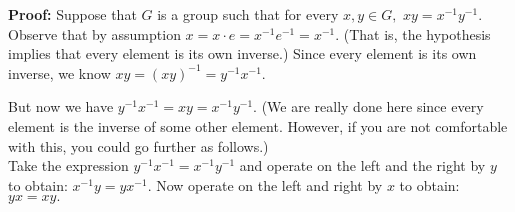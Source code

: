\documentclass[12pt]{article}
\begin{document}
\begin{enumerate}
\textbf{Proof:} Suppose that $G$ is a group such that for every $x,y \in G,$ $xy=x^{-1}y^{-1}.$\\

Observe that by assumption $x=x\cdot e = x^{-1}e^{-1}=x^{-1}.$ (That is, the hypothesis implies that every element is its own inverse.) Since every element is its own inverse, we know $xy=(xy)^{-1}=y^{-1}x^{-1}.$ 

But now we have $ y^{-1}x^{-1}=xy=x^{-1}y^{-1}.$ (We are really done here since every element is the inverse of some other element. However, if you are not comfortable with this, you could go further as follows.)\\

Take the expression $ y^{-1}x^{-1}=x^{-1}y^{-1}$ and operate on the left and the right by $y$ to obtain: $ x^{-1}y=yx^{-1}.$ Now operate on the left and right by $x$ to obtain: $yx=xy.$

\end{enumerate}
\end{document}
